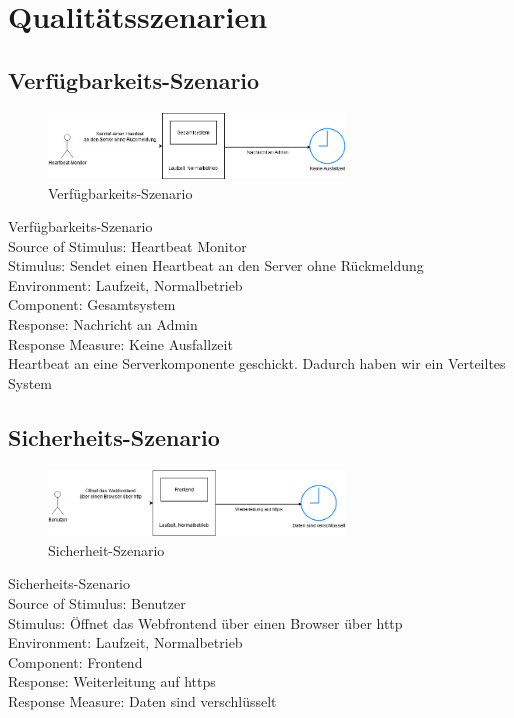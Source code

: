 \chapter{Qualitätsszenarien}
\label{ch:Qualitaetsszenarien}

\section{Verfügbarkeits-Szenario}
\begin{figure}[tbh]
  \centering
  \includegraphics[width=0.7\textwidth]{Graphics/Verfuegbarkeit.png}
  \caption{Verfügbarkeits-Szenario}
  \label{fig:Qualitaet1}
\end{figure}

Verfügbarkeits-Szenario\\
Source of Stimulus: Heartbeat Monitor\\
Stimulus: Sendet einen Heartbeat an den Server ohne Rückmeldung\\
Environment: Laufzeit, Normalbetrieb\\
Component: Gesamtsystem\\
Response: Nachricht an Admin\\
Response Measure: Keine Ausfallzeit\\

Heartbeat an eine Serverkomponente geschickt.  Dadurch haben wir ein Verteiltes System


\section{Sicherheits-Szenario}
\begin{figure}[tbh]
  \centering
  \includegraphics[width=0.7\textwidth]{Graphics/Sicherheit.png}
  \caption{Sicherheit-Szenario}
  \label{fig:Qualitaet2}
\end{figure}


Sicherheits-Szenario\\
Source of Stimulus: Benutzer\\
Stimulus: Öffnet das Webfrontend über einen Browser über http\\
Environment: Laufzeit, Normalbetrieb\\
Component: Frontend\\
Response: Weiterleitung auf https\\
Response Measure: Daten sind verschlüsselt\\



